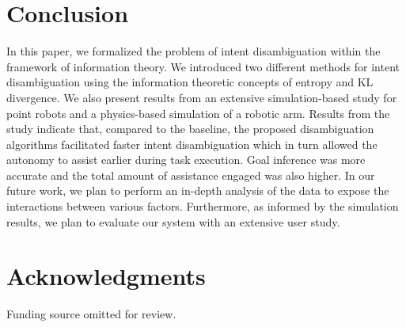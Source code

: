 \documentclass[conference]{IEEEtran}
\begin{document}

\section{Conclusion}\label{sec:conclusions}
In this paper, we formalized the problem of intent disambiguation within the framework of information theory. We introduced two different methods for intent disambiguation using the information theoretic concepts of entropy and KL divergence. We also present results from an extensive simulation-based study for point robots and a physics-based simulation of a robotic arm. Results from the study indicate that, compared to the baseline, the proposed disambiguation algorithms facilitated faster intent disambiguation which in turn allowed the autonomy to assist earlier during task execution. Goal inference was more accurate and the total amount of assistance engaged was also higher. In our future work, we plan to perform an in-depth analysis of the data to expose the interactions between various factors. Furthermore, as informed by the simulation results, we plan to evaluate our system with an extensive user study. 

\section*{Acknowledgments}
Funding source omitted for review. 
\balance


\end{document}

